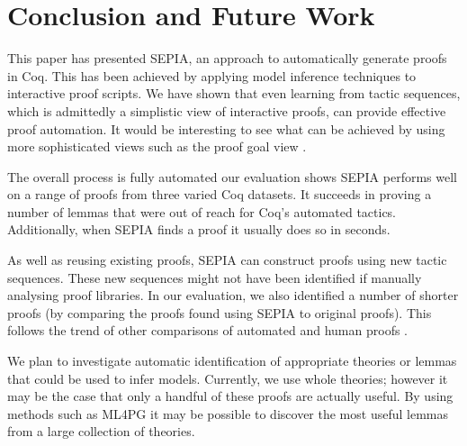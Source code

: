 \documentclass{llncs}
\begin{document}
\section{Conclusion and Future Work}
\label{sec:conclusion}
This paper has presented SEPIA, an approach to automatically generate proofs in Coq. This has been achieved by applying model inference techniques to interactive proof scripts. We have shown that even learning from tactic sequences, which is admittedly a simplistic view of interactive proofs, can provide effective proof automation. It would be interesting to see what can be achieved by using more sophisticated views such as the proof goal view \cite{Grov12}.

The overall process is fully automated our evaluation shows SEPIA performs well on a range of proofs from three varied Coq datasets. It succeeds in proving a number of lemmas that were out of reach for Coq's automated tactics. Additionally, when SEPIA finds a proof it usually does so in seconds. 

As well as reusing existing proofs, SEPIA can construct proofs using new tactic sequences. These new sequences might not have been identified if manually analysing proof libraries. In our evaluation, we also identified a number of shorter proofs (by comparing the proofs found using SEPIA to original proofs). This follows the trend of other comparisons of automated and human proofs \cite{Alama12}.

We plan to investigate automatic identification of appropriate theories or lemmas that could be used to infer models. Currently, we use whole theories; however it may be the case that only a handful of these proofs are actually useful. By using methods such as ML4PG \cite{ML4PG13} it may be possible to discover the most useful lemmas from a large collection of theories. 



\end{document}

